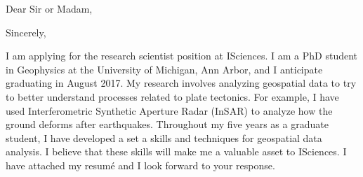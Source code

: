 \documentclass[11pt,a4paper,sans]{moderncv}
\begin{document}
\date{April 14, 2017}
\opening{Dear Sir or Madam,}
\closing{Sincerely,}
\makelettertitle

I am applying for the research scientist position at ISciences. I am a PhD student in Geophysics at the University of Michigan, Ann Arbor, and I anticipate graduating in August 2017. My research involves analyzing geospatial data to try to better understand processes related to plate tectonics. For example, I have used Interferometric Synthetic Aperture Radar (InSAR) to analyze how the ground deforms after earthquakes. Throughout my five years as a graduate student, I have developed a set a skills and techniques for geospatial data analysis.  I believe that these skills will make me a valuable asset to ISciences. I have attached my resum\'e and I look forward to your response.

\makeletterclosing
\end{document}
